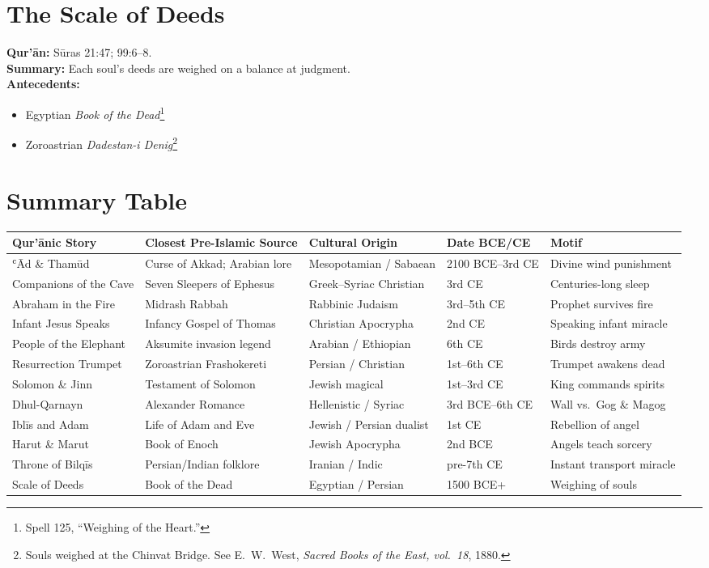 \documentclass[11pt,a4paper]{article}
\begin{document}
\section{The Scale of Deeds}
\textbf{Qur’ān:} Sūras 21:47; 99:6–8.\\
\textbf{Summary:} Each soul’s deeds are weighed on a balance at judgment.\\
\textbf{Antecedents:}
\begin{itemize}
  \item Egyptian \emph{Book of the Dead}\footnote{Spell 125, “Weighing of the Heart.”}
  \item Zoroastrian \emph{Dadestan-i Denig}\footnote{Souls weighed at the Chinvat Bridge. See E.\ W.\ West, \emph{Sacred Books of the East, vol.\ 18}, 1880.}
\end{itemize}

\section{Summary Table}
\renewcommand{\arraystretch}{1.2}
\begin{longtable}{>{\raggedright}p{3.3cm} >{\raggedright}p{3.8cm} >{\raggedright}p{3cm} >{\raggedright}p{2cm} >{\raggedright\arraybackslash}p{4cm}}
\toprule
\textbf{Qur’ānic Story} & \textbf{Closest Pre-Islamic Source} & \textbf{Cultural Origin} & \textbf{Date BCE/CE} & \textbf{Motif} \\
\midrule
ʿĀd \& Thamūd & Curse of Akkad; Arabian lore & Mesopotamian / Sabaean & 2100 BCE–3rd CE & Divine wind punishment \\
Companions of the Cave & Seven Sleepers of Ephesus & Greek–Syriac Christian & 3rd CE & Centuries-long sleep \\
Abraham in the Fire & Midrash Rabbah & Rabbinic Judaism & 3rd–5th CE & Prophet survives fire \\
Infant Jesus Speaks & Infancy Gospel of Thomas & Christian Apocrypha & 2nd CE & Speaking infant miracle \\
People of the Elephant & Aksumite invasion legend & Arabian / Ethiopian & 6th CE & Birds destroy army \\
Resurrection Trumpet & Zoroastrian Frashokereti & Persian / Christian & 1st–6th CE & Trumpet awakens dead \\
Solomon \& Jinn & Testament of Solomon & Jewish magical & 1st–3rd CE & King commands spirits \\
Dhul-Qarnayn & Alexander Romance & Hellenistic / Syriac & 3rd BCE–6th CE & Wall vs.\ Gog \& Magog \\
Iblīs and Adam & Life of Adam and Eve & Jewish / Persian dualist & 1st CE & Rebellion of angel \\
Harut \& Marut & Book of Enoch & Jewish Apocrypha & 2nd BCE & Angels teach sorcery \\
Throne of Bilqīs & Persian/Indian folklore & Iranian / Indic & pre-7th CE & Instant transport miracle \\
Scale of Deeds & Book of the Dead & Egyptian / Persian & 1500 BCE+ & Weighing of souls \\
\bottomrule
\end{longtable}
\end{document}
